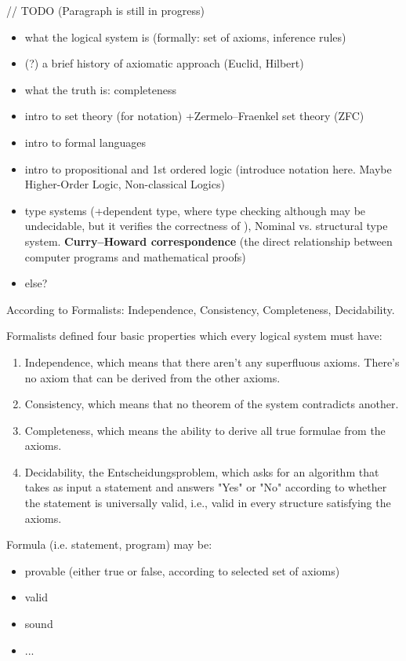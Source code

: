 \documentclass[article]{aaltoseries}
\begin{document}
// TODO (Paragraph is still in progress)

\begin{itemize}
\itemsep0em
	\item what the logical system is (formally: set of axioms, inference rules)
	\item (?) a brief history of axiomatic approach (Euclid, Hilbert)
	\item what the truth is: completeness
	\item intro to set theory (for notation) +Zermelo–Fraenkel set theory (ZFC)
	\item intro to formal languages
	\item intro to propositional and 1st ordered logic (introduce notation here. Maybe Higher-Order Logic, Non-classical Logics)
	\item type systems (+dependent type, where type checking although may be undecidable, but it verifies the correctness of ), Nominal vs. structural type system. \textbf{Curry–Howard correspondence} (the direct relationship between computer programs and mathematical proofs)
	\item else?
\end{itemize}

According to Formalists: Independence, Consistency, Completeness, Decidability.

Formalists defined four basic properties which every logical system must have:
\begin{enumerate}
\itemsep0em
	\item Independence, which means that there aren’t any superfluous axioms. There’s no axiom that can be derived from the other axioms.
	\item Consistency, which means that no theorem of the system contradicts another.
	\item Completeness, which means the ability to derive all true formulae from the axioms.
	\item Decidability, the Entscheidungsproblem, which asks for an algorithm that takes as input a statement and answers "Yes" or "No" according to whether the statement is universally valid, i.e., valid in every structure satisfying the axioms.
\end{enumerate}

Formula (i.e. statement, program) may be:
\begin{itemize}
\itemsep0em
	\item provable (either true or false, according to selected set of axioms)
	\item valid
	\item sound
	\item ...
\end{itemize}
\end{document}
